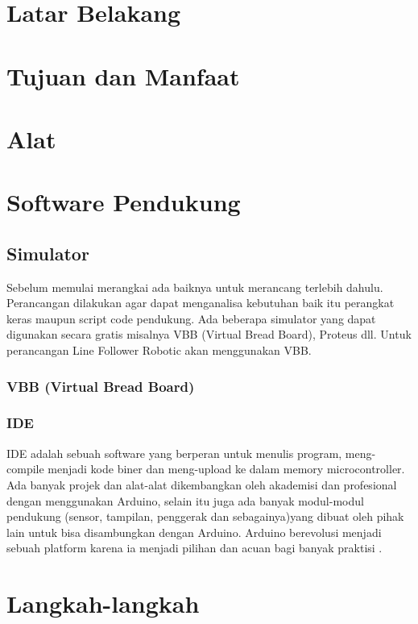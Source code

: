 \section{Latar Belakang}

\section{Tujuan dan Manfaat}

\section{Alat}


\section{Software Pendukung}
\subsection{Simulator}
Sebelum memulai merangkai ada baiknya untuk merancang terlebih dahulu. Perancangan dilakukan agar dapat menganalisa kebutuhan baik itu perangkat keras maupun script code pendukung. Ada beberapa simulator yang dapat digunakan secara gratis misalnya VBB (Virtual Bread Board), Proteus dll. Untuk perancangan Line Follower Robotic akan menggunakan VBB.
\subsubsection{VBB (Virtual Bread Board)}


\subsubsection{IDE}
IDE adalah sebuah software yang berperan untuk menulis program, meng-compile menjadi kode biner dan meng-upload ke dalam memory microcontroller. Ada banyak projek dan alat-alat dikembangkan oleh akademisi dan profesional dengan menggunakan Arduino, selain itu juga ada banyak modul-modul pendukung (sensor, tampilan, penggerak dan sebagainya)yang dibuat oleh pihak lain untuk bisa disambungkan dengan Arduino. Arduino berevolusi menjadi sebuah platform karena ia menjadi pilihan dan acuan bagi banyak praktisi \cite{djuandi2011pengenalan}.

\section{Langkah-langkah}